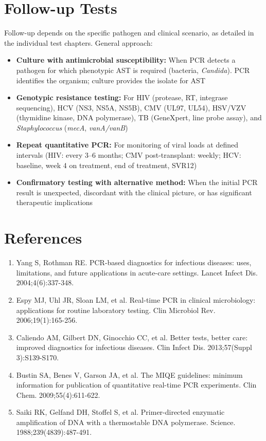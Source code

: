 \section*{Follow-up Tests}
Follow-up depends on the specific pathogen and clinical scenario, as detailed in the individual test chapters. General approach:
\begin{itemize}
  \item \textbf{Culture with antimicrobial susceptibility:} When PCR detects a pathogen for which phenotypic AST is required (bacteria, \textit{Candida}). PCR identifies the organism; culture provides the isolate for AST
  \item \textbf{Genotypic resistance testing:} For HIV (protease, RT, integrase sequencing), HCV (NS3, NS5A, NS5B), CMV (UL97, UL54), HSV/VZV (thymidine kinase, DNA polymerase), TB (GeneXpert, line probe assay), and \textit{Staphylococcus} (\textit{mecA}, \textit{vanA/vanB})
  \item \textbf{Repeat quantitative PCR:} For monitoring of viral loads at defined intervals (HIV: every 3--6 months; CMV post-transplant: weekly; HCV: baseline, week 4 on treatment, end of treatment, SVR12)
  \item \textbf{Confirmatory testing with alternative method:} When the initial PCR result is unexpected, discordant with the clinical picture, or has significant therapeutic implications
\end{itemize}

\section*{References}
\begin{enumerate}
  \item Yang S, Rothman RE. PCR-based diagnostics for infectious diseases: uses, limitations, and future applications in acute-care settings. Lancet Infect Dis. 2004;4(6):337-348.
  \item Espy MJ, Uhl JR, Sloan LM, et al. Real-time PCR in clinical microbiology: applications for routine laboratory testing. Clin Microbiol Rev. 2006;19(1):165-256.
  \item Caliendo AM, Gilbert DN, Ginocchio CC, et al. Better tests, better care: improved diagnostics for infectious diseases. Clin Infect Dis. 2013;57(Suppl 3):S139-S170.
  \item Bustin SA, Benes V, Garson JA, et al. The MIQE guidelines: minimum information for publication of quantitative real-time PCR experiments. Clin Chem. 2009;55(4):611-622.
  \item Saiki RK, Gelfand DH, Stoffel S, et al. Primer-directed enzymatic amplification of DNA with a thermostable DNA polymerase. Science. 1988;239(4839):487-491.
\end{enumerate}

\clearpage
